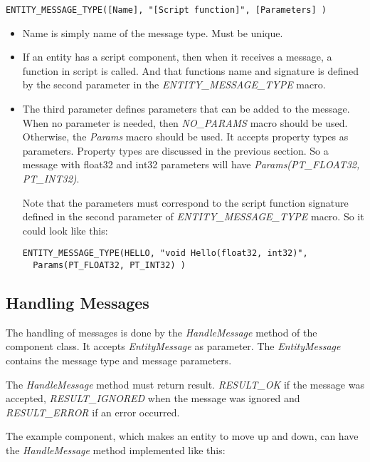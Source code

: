 \documentclass[a4paper, 12pt]{report}
\begin{document}
\begin{verbatim}
ENTITY_MESSAGE_TYPE([Name], "[Script function]", [Parameters] )
\end{verbatim}

\begin{itemize}
\item
Name is simply name of the message type. Must be unique.
\item
If an entity has a script component, then when it receives a message, a function in script is called. And that functions name and signature is defined by the second parameter in the \emph{ENTITY\_MESSAGE\_TYPE} macro.
\item
The third parameter defines parameters that can be added to the message. When no parameter is needed, then \emph{NO\_PARAMS} macro should be used. Otherwise, the \emph{Params} macro should be used. It accepts property types as parameters. Property types are discussed in the previous section.
So a message with float32 and int32 parameters will have \emph{Params(PT\_FLOAT32, PT\_INT32)}.

Note that the parameters must correspond to the script function signature defined in the second parameter of \emph{ENTITY\_MESSAGE\_TYPE} macro. So it could look like this: 

\begin{verbatim}
ENTITY_MESSAGE_TYPE(HELLO, "void Hello(float32, int32)",
  Params(PT_FLOAT32, PT_INT32) )
\end{verbatim}

\end{itemize}

\subsection{Handling Messages}

 The handling of messages is done by the \emph{HandleMessage} method of the component class. It accepts \emph{EntityMessage} as parameter. The \emph{EntityMessage} contains the message type and message parameters. 

The \emph{HandleMessage} method must return result. \emph{RESULT\_OK} if the message was accepted, \emph{RESULT\_IGNORED} when the message was ignored and \emph{RESULT\_ERROR} if an error occurred.

The example component, which makes an entity to move up and down, can have the \emph{HandleMessage} method implemented like this:
\end{document}
